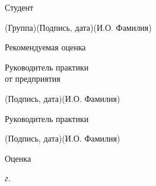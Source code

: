 \documentclass[14pt, russian]{scrartcl}
\begin{document}
\begin{titlepage}
\vspace{\fill}
 

\noindent Студент \underline{\hspace{1.5cm}} \hfill \underline{\hspace{4cm}}\quad
\underline{\hspace{4cm}}

\vspace{-2.1ex}
\noindent\hspace{9ex}\scriptsize{(Группа)}\normalsize\hspace{170pt}\hspace{2ex}\scriptsize{(Подпись, дата)}\normalsize\hspace{30pt}\hspace{6ex}\scriptsize{(И.О. Фамилия)}\normalsize

\bigskip

\noindent Рекомендуемая оценка\hfill\underline{\hspace{195pt}}\hfill

\bigskip

\noindent \parbox{0.333\textwidth}{Руководитель практики\\от предприятия}  
\hfill \underline{\hspace{4cm}}\quad \underline{\hspace{4cm}}

\vspace{-2ex}
\noindent\hspace{13.5ex}\normalsize\hspace{170pt}\hspace{2ex}\scriptsize{(Подпись, дата)}\normalsize\hspace{30pt}\hspace{6ex}\scriptsize{(И.О. Фамилия)}\normalsize


\bigskip

\noindent Руководитель практики  \hfill \underline{\hspace{4cm}}\quad
\underline{\hspace{4cm}}

\vspace{-2ex}
\noindent\hspace{13.5ex}\normalsize\hspace{170pt}\hspace{2ex}\scriptsize{(Подпись, дата)}\normalsize\hspace{30pt}\hspace{6ex}\scriptsize{(И.О. Фамилия)}\normalsize

\vspace{2ex}
\noindent Оценка\hfill\underline{\hspace{195pt}}

\vfill

 


\begin{center}
\textsl{\the\year{} г.}
\end{center}
\end{titlepage}
\end{document}
